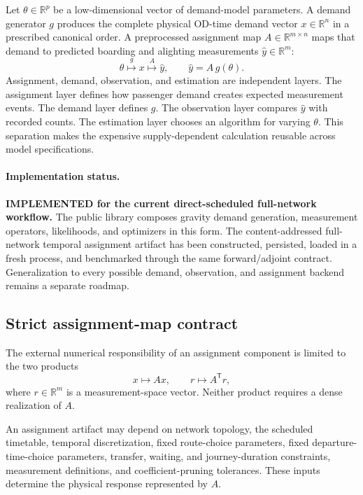 Let $\theta\in\mathbb{R}^{p}$ be a low-dimensional vector of demand-model
parameters.  A demand generator $g$ produces the complete physical OD-time
demand vector $x\in\mathbb{R}^{n}$ in a prescribed canonical order.  A
preprocessed assignment map $A\in\mathbb{R}^{m\times n}$ maps that demand to
predicted boarding and alighting measurements
$\widehat y\in\mathbb{R}^{m}$:
\begin{equation}
  \theta
  \overset{g}{\longmapsto}
  x
  \overset{A}{\longmapsto}
  \widehat y,
  \qquad
  \widehat y=A\,g(\theta).
  \label{eq:planned-layered-forward-map}
\end{equation}
Assignment, demand, observation, and estimation are independent layers.  The
assignment layer defines how passenger demand creates expected measurement
events.  The demand layer defines $g$.  The observation layer compares
$\widehat y$ with recorded counts.  The estimation layer chooses an algorithm
for varying $\theta$.  This separation makes the expensive supply-dependent
calculation reusable across model specifications.

\paragraph{Implementation status.}
\textbf{IMPLEMENTED for the current direct-scheduled full-network workflow.}
The public library composes gravity demand generation, measurement operators,
likelihoods, and optimizers in this form.  The content-addressed full-network
temporal assignment artifact has been constructed, persisted, loaded in a
fresh process, and benchmarked through the same forward/adjoint contract.
Generalization to every possible demand, observation, and assignment backend
remains a separate roadmap.

\subsection{Strict assignment-map contract}
\label{sec:strict-assignment-map-contract}

The external numerical responsibility of an assignment component is limited
to the two products
\begin{equation}
  x\longmapsto Ax,
  \qquad
  r\longmapsto A^{\mathsf T}r,
  \label{eq:assignment-forward-adjoint-contract}
\end{equation}
where $r\in\mathbb{R}^{m}$ is a measurement-space vector.  Neither product
requires a dense realization of $A$.

An assignment artifact may depend on network topology, the scheduled
timetable, temporal discretization, fixed route-choice parameters, fixed
departure-time-choice parameters, transfer, waiting, and journey-duration
constraints, measurement definitions, and coefficient-pruning tolerances.
These inputs determine the physical response represented by $A$.

